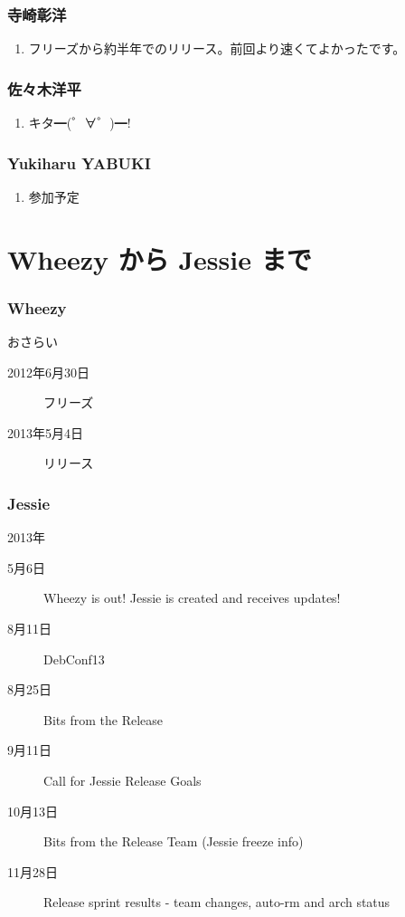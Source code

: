 \documentclass[cjk,dvipdfmx,10pt,compress,%
hyperref={bookmarks=true,bookmarksnumbered=true,bookmarksopen=false,%
colorlinks=false,%
pdftitle={第 97 回 関西 Debian 勉強会},%
pdfauthor={倉敷・のがた・佐々木・かわだ},%
pdfsubject={資料},%
}]{beamer}
\begin{document}
\begin{frame}
  \frametitle{ 寺崎彰洋 }
  \begin{enumerate}
  \item フリーズから約半年でのリリース。前回より速くてよかったです。
  \end{enumerate}
\end{frame}

\begin{frame}
  \frametitle{ 佐々木洋平 }
  \begin{enumerate}
  \item キタ━(゜∀゜)━!
  \end{enumerate}
\end{frame}

\begin{frame}
  \frametitle{ Yukiharu YABUKI }
  \begin{enumerate}
  \item 参加予定
  \end{enumerate}
\end{frame}


\section{Wheezy から Jessie まで}

\begin{frame}
  \frametitle{ Wheezy }
  \begin{block}{おさらい}
    \begin{description}
    \item[2012年6月30日]
      フリーズ
    \item[2013年5月4日]
      リリース
    \end{description}
  \end{block}
\end{frame}


\begin{frame}
  \frametitle{ Jessie }
  \begin{block}{2013年}
    \begin{description}
    \item[5月6日]
      Wheezy is out! Jessie is created and receives updates!
    \item[8月11日]
      DebConf13
    \item[8月25日]
      Bits from the Release
    \item[9月11日]
      Call for Jessie Release Goals
    \item[10月13日]
      Bits from the Release Team (Jessie freeze info)
    \item[11月28日]
      Release sprint results - team changes, auto-rm and arch status
    \end{description}
  \end{block}
\end{frame}
\end{document}
